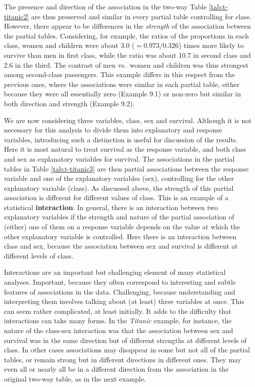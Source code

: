 \documentclass[11pt,a4paper,openany]{book}
\begin{document}
The presence and direction of the association in the two-way Table
\ref{tab:t-titanic2} are thus preserved and similar in every partial
table controlling for class. However, there appear to be differences in
the \emph{strength} of the association between the partial tables.
Considering, for example, the ratios of the proportions in each class,
women and children were about 3.0 (\(=0.973/0.326\)) times more likely
to survive than men in first class, while the ratio was about 10.7 in
second class and 2.6 in the third. The contrast of men vs.~women and
children was thus strongest among second-class passengers. This example
differs in this respect from the previous ones, where the associations
were similar in each partial table, either because they were all
essentially zero (Example 9.1) or non-zero but similar in both direction
and strength (Example 9.2).

We are now considering three variables, class, sex and survival.
Although it is not necessary for this analysis to divide them into
explanatory and response variables, introducing such a distinction is
useful for discussion of the results. Here it is most natural to treat
survival as the response variable, and both class and sex as explanatory
variables for survival. The associations in the partial tables in Table
\ref{tab:t-titanic3} are then partial associations between the response
variable and one of the explanatory variables (sex), controlling for the
other explanatory variable (class). As discussed above, the strength of
this partial association is different for different values of class.
This is an example of a statistical \textbf{interaction}. In general,
there is an interaction between two explanatory variables if the
strength and nature of the partial association of (either) one of them
on a response variable depends on the value at which the other
explanatory variable is controlled. Here there is an interaction between
class and sex, because the association between sex and survival is
different at different levels of class.

Interactions are an important but challenging element of many
statistical analyses. Important, because they often correspond to
interesting and subtle features of associations in the data.
Challenging, because understanding and interpreting them involves
talking about (at least) three variables at once. This can seem rather
complicated, at least initially. It adds to the difficulty that
interactions can take many forms. In the \emph{Titanic} example, for
instance, the nature of the class-sex interaction was that the
association between sex and survival was in the same direction but of
different strengths at different levels of class. In other cases
associations may disappear in some but not all of the partial tables, or
remain strong but in different directions in different ones. They may
even all or nearly all be in a different direction from the association
in the original two-way table, as in the next example.
\end{document}
